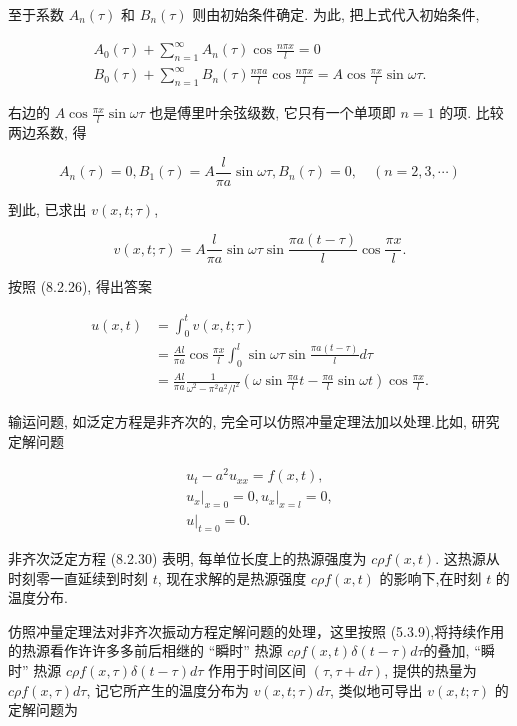 至于系数 $A_{n}(\tau)$ 和 $B_{n}(\tau)$ 则由初始条件确定. 为此, 把上式代入初始条件,

$$
\begin{gathered}
A_{0}(\tau)+\sum_{n=1}^{\infty} A_{n}(\tau) \cos \frac{n \pi x}{l}=0 \\
B_{0}(\tau)+\sum_{n=1}^{\infty} B_{n}(\tau) \frac{n \pi a}{l} \cos \frac{n \pi x}{l}=A \cos \frac{\pi x}{l} \sin \omega \tau .
\end{gathered}
$$

右边的 $A \cos \frac{\pi x}{l} \sin \omega \tau$ 也是傅里叶余弦级数, 它只有一个单项即 $n=1$ 的项. 比较两边系数, 得

$$
A_{n}(\tau)=0, B_{1}(\tau)=A \frac{l}{\pi a} \sin \omega \tau, B_{n}(\tau)=0, \quad(n=2,3, \cdots)
$$

到此, 已求出 $v(x, t ; \tau)$,

$$
v(x, t ; \tau)=A \frac{l}{\pi a} \sin \omega \tau \sin \frac{\pi a(t-\tau)}{l} \cos \frac{\pi x}{l} .
$$

按照 (8.2.26), 得出答案

$$
\begin{aligned}
u(x, t) & =\int_{0}^{t} v(x, t ; \tau) \\
& =\frac{A l}{\pi a} \cos \frac{\pi x}{l} \int_{0}^{l} \sin \omega \tau \sin \frac{\pi a(t-\tau)}{l} d \tau \\
& =\frac{A l}{\pi a} \frac{1}{\omega^{2}-\pi^{2} a^{2} / l^{2}}\left(\omega \sin \frac{\pi a}{l} t-\frac{\pi a}{l} \sin \omega t\right) \cos \frac{\pi x}{l} .
\end{aligned}
$$

输运问题, 如泛定方程是非齐次的, 完全可以仿照冲量定理法加以处理.比如, 研究定解问题

$$
\begin{gathered}
u_{t}-a^{2} u_{x x}=f(x, t), \\
\left.u_{x}\right|_{x=0}=0,\left.u_{x}\right|_{x=l}=0, \\
\left.u\right|_{t=0}=0 .
\end{gathered}
$$

非齐次泛定方程 (8.2.30) 表明, 每单位长度上的热源强度为 $c \rho f(x, t)$. 这热源从时刻零一直延续到时刻 $t$, 现在求解的是热源强度 $c \rho f(x, t)$ 的影响下,在时刻 $t$ 的温度分布.

仿照冲量定理法对非齐次振动方程定解问题的处理，这里按照 (5.3.9),将持续作用的热源看作许许多多前后相继的 “瞬时” 热源 $c \rho f(x, t) \delta(t-\tau) d \tau$的叠加, “瞬时” 热源 $c \rho f(x, \tau) \delta(t-\tau) d \tau$ 作用于时间区间 $(\tau, \tau+d \tau)$, 提供的热量为 $c \rho f(x, \tau) d \tau$, 记它所产生的温度分布为 $v(x, t ; \tau) d \tau$, 类似地可导出 $v(x, t ; \tau)$ 的定解问题为

